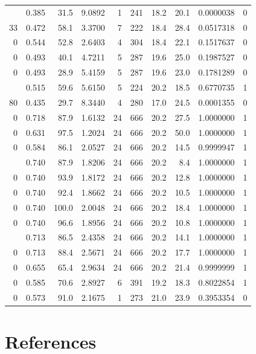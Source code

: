\documentclass[]{article}
\begin{document}
\begin{table}[H]
\begin{tabular}{rrrrrrrrrr}
\addlinespace
80 & 0.385 & 31.5 & 9.0892 & 1 & 241 & 18.2 & 20.1 & 0.0000038 & 0\\
33 & 0.472 & 58.1 & 3.3700 & 7 & 222 & 18.4 & 28.4 & 0.0517318 & 0\\
0 & 0.544 & 52.8 & 2.6403 & 4 & 304 & 18.4 & 22.1 & 0.1517637 & 0\\
0 & 0.493 & 40.1 & 4.7211 & 5 & 287 & 19.6 & 25.0 & 0.1987527 & 0\\
0 & 0.493 & 28.9 & 5.4159 & 5 & 287 & 19.6 & 23.0 & 0.1781289 & 0\\
\addlinespace
0 & 0.515 & 59.6 & 5.6150 & 5 & 224 & 20.2 & 18.5 & 0.6770735 & 1\\
80 & 0.435 & 29.7 & 8.3440 & 4 & 280 & 17.0 & 24.5 & 0.0001355 & 0\\
0 & 0.718 & 87.9 & 1.6132 & 24 & 666 & 20.2 & 27.5 & 1.0000000 & 1\\
0 & 0.631 & 97.5 & 1.2024 & 24 & 666 & 20.2 & 50.0 & 1.0000000 & 1\\
0 & 0.584 & 86.1 & 2.0527 & 24 & 666 & 20.2 & 14.5 & 0.9999947 & 1\\
\addlinespace
0 & 0.740 & 87.9 & 1.8206 & 24 & 666 & 20.2 & 8.4 & 1.0000000 & 1\\
0 & 0.740 & 93.9 & 1.8172 & 24 & 666 & 20.2 & 12.8 & 1.0000000 & 1\\
0 & 0.740 & 92.4 & 1.8662 & 24 & 666 & 20.2 & 10.5 & 1.0000000 & 1\\
0 & 0.740 & 100.0 & 2.0048 & 24 & 666 & 20.2 & 18.4 & 1.0000000 & 1\\
0 & 0.740 & 96.6 & 1.8956 & 24 & 666 & 20.2 & 10.8 & 1.0000000 & 1\\
\addlinespace
0 & 0.713 & 86.5 & 2.4358 & 24 & 666 & 20.2 & 14.1 & 1.0000000 & 1\\
0 & 0.713 & 88.4 & 2.5671 & 24 & 666 & 20.2 & 17.7 & 1.0000000 & 1\\
0 & 0.655 & 65.4 & 2.9634 & 24 & 666 & 20.2 & 21.4 & 0.9999999 & 1\\
0 & 0.585 & 70.6 & 2.8927 & 6 & 391 & 19.2 & 18.3 & 0.8022854 & 1\\
0 & 0.573 & 91.0 & 2.1675 & 1 & 273 & 21.0 & 23.9 & 0.3953354 & 0\\
\bottomrule
\end{tabular}
\end{table}

\section{References}\label{references}
\end{document}

